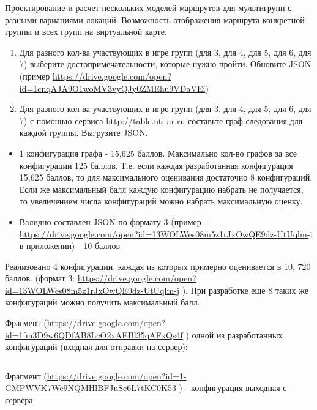 
Проектирование и расчет нескольких моделей маршрутов для мультигрупп с разными вариациями локаций. Возможность отображения маршрута конкретной группы и всех групп на виртуальной карте.
\begin{enumerate}
    \item    Для разного кол-ва участвующих в игре групп (для 3, для 4, для 5, для 6, для 7) выберите достопримечательности, которые нужно пройти. Обновите JSON (пример \url{https://drive.google.com/open?id=1cnqAJA9O1woMV3vyQJy0ZMEhu9VDaVEi})
    \item    Для разного кол-ва участвующих в игре групп (для 3, для 4, для 5, для 6, для 7) с помощью сервиса \url{http://table.nti-ar.ru} составьте граф следования для каждой группы. Выгрузите JSON.
\end{enumerate}

\markSection
\begin{itemize}
    \item 	1 конфигурация графа - 15,625 баллов. Максимально кол-во графов за все конфигурации 125 баллов. Т.е. если каждая разработанная конфигурация 15,625 баллов, то для максимального оценивания достаточно 8 конфигураций. Если же максимальный балл каждую конфигурацию набрать не получается, то увеличением числа конфигураций можно набрать максимальную оценку. 
    \item Валидно составлен JSON по формату 3 (пример - \url{https://drive.google.com/open?id=13WOLWes08m5z1rJxOwQE9dz-UtUqlm-j}  в приложении) - 10 баллов
\end{itemize}

\solutionSection

Реализовано 4 конфигурации, каждая из которых примерно оценивается в 10, 720 баллов. (формат 3: \url{https://drive.google.com/open?id=13WOLWes08m5z1rJxOwQE9dz-UtUqlm-j} ). При разработке еще 8 таких же конфигураций можно получить максимальный балл. 

Фрагмент (\url{https://drive.google.com/open?id=1fm3D9w6QDfAB8LcO2xAEBl35qAFxQs4f} ) одной из разработанных конфигураций (входная для отправки на сервер):

\inputminted[fontsize=\footnotesize, linenos]{json}{final/command_tour/ar/task_07/source_1.json}

Фрагмент (\url{https://drive.google.com/open?id=1-GMPWVK7We9NQMHlBFJuSe6L7tKC0K53} ) - конфигурация выходная с сервера:

\inputminted[fontsize=\footnotesize, linenos]{json}{final/command_tour/ar/task_07/source_2.json}

